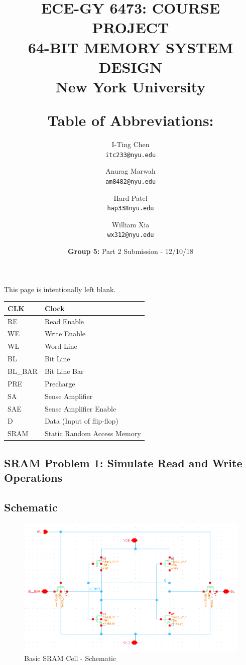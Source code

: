 \documentclass[10pt,letterpaper,onecolumn]{article}
\title{
  \textbf{ECE-GY 6473: COURSE PROJECT}\\
  \textbf{64-BIT MEMORY SYSTEM DESIGN}\\
  \textbf{New York University}\\ 
  \date{\textbf{Group 5:} Part 2 Submission - 12/10/18}
}
\author{
  I-Ting Chen\\
  \texttt{itc233@nyu.edu}
  \and
  Anurag Marwah\\
  \texttt{am8482@nyu.edu}
  \and
  Hard Patel\\
  \texttt{hap338nyu.edu}
  \and
  William Xia\\
  \texttt{wx312@nyu.edu}
}
\begin{document}
\maketitle

\clearpage
\begin{center}
    This page is intentionally left blank.
\end{center}

\renewcommand*\contentsname{Table of Contents}
\clearpage
\tableofcontents

\clearpage
\title{\textbf{Table of Abbreviations:}}
\begin{table}[h!]
\centering
\begin{tabu} to 0.8\textwidth { | X[l] | X[l] | }
  \hline
  CLK & Clock \\ 
  \hline
  RE & Read Enable \\  
  \hline
  WE & Write Enable \\
  \hline
  WL & Word Line \\
  \hline
  BL & Bit Line \\
  \hline
  BL\_BAR & Bit Line Bar \\
  \hline
  PRE & Precharge \\
  \hline
  SA & Sense Amplifier \\
  \hline
  SAE & Sense Amplifier Enable \\
  \hline
  D & Data (Input of flip-flop) \\
  \hline
  SRAM & Static Random Access Memory \\
  \hline
\end{tabu}
\end{table}

\clearpage
\begin{center}
\section{SRAM Problem 1: Simulate Read and Write Operations}
\end{center}

\subsection{Schematic}
\begin{figure}[h!]
\centering
\includegraphics[clip,width=\columnwidth]{sram_cell_basic.png}
\caption{Basic SRAM Cell - Schematic}
\label{fig:sram_cell_basic}
\end{figure}
\end{document}
